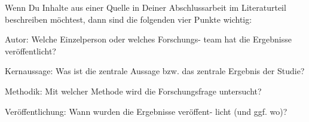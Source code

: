 Wenn Du Inhalte aus einer Quelle in Deiner Abschlussarbeit im Literaturteil beschreiben möchtest, dann sind die folgenden vier Punkte wichtig:

    Autor: Welche Einzelperson oder welches Forschungs- team hat die Ergebnisse veröffentlicht?

    Kernaussage: Was ist die zentrale Aussage bzw. das zentrale Ergebnis der Studie?

    Methodik: Mit welcher Methode wird die Forschungsfrage untersucht?

    Veröffentlichung: Wann wurden die Ergebnisse veröffent- licht (und ggf. wo)?

